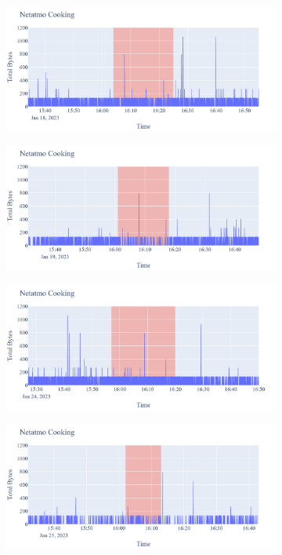 \begin{figure}[H]
\begin{subfigure}[b]{0.5\textwidth}
        \centering
        \includegraphics[width=1.2\hsize]{figures/Netatmo_Cooking_Bytes_18.01.png}
    \end{subfigure}
    \begin{subfigure}[b]{0.5\textwidth}
        \centering
        \includegraphics[width=1.2\hsize]{figures/Netatmo_Cooking_Bytes_19.01.png}
    \end{subfigure}
    \begin{subfigure}[b]{0.5\textwidth}
        \centering
        \includegraphics[width=1.2\hsize]{figures/Netatmo_Cooking_Bytes_24.01.png}
    \end{subfigure}
    \begin{subfigure}[b]{0.5\textwidth}
        \centering
        \includegraphics[width=1.2\hsize]{figures/Netatmo_Cooking_Bytes_25.01.png}

\end{subfigure}
\end{figure}

